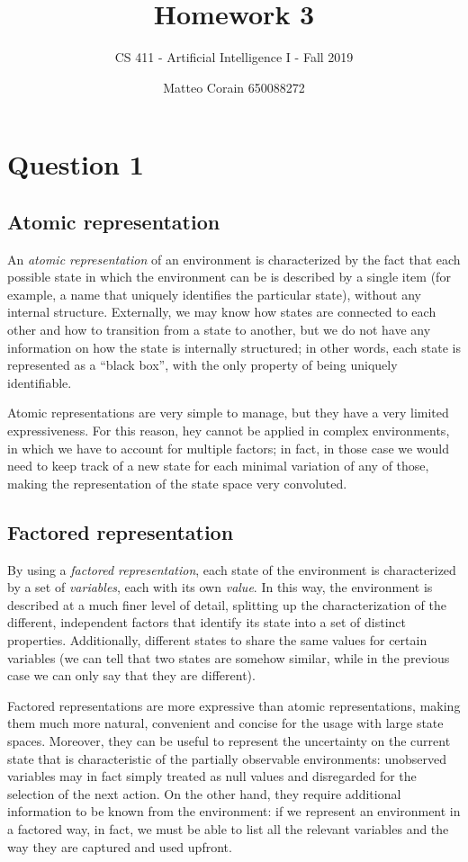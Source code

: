 \documentclass[letterpaper,headings=standardclasses]{scrartcl}
\title{Homework 3}
\subtitle{CS 411 - Artificial Intelligence I - Fall 2019}
\author{Matteo Corain 650088272}
\begin{document}
\maketitle

\section{Question 1}

\subsection{Atomic representation}

An \emph{atomic representation} of an environment is characterized by the fact that each possible state in which the environment can be is described by a single item (for example, a name that uniquely identifies the particular state), without any internal structure. Externally, we may know how states are connected to each other and how to transition from a  state to another, but we do not have any information on how the state is internally structured; in other words, each state is represented as a “black box”, with the only property of being uniquely identifiable.

Atomic representations are very simple to manage, but they have a very limited expressiveness. For this reason, hey cannot be applied in complex environments, in which we have to account for multiple factors; in fact, in those case we would need to keep track of a new state for each minimal variation of any of those, making the representation of the state space very convoluted.

\subsection{Factored representation}

By using a \emph{factored representation}, each state of the environment is characterized by a set of \emph{variables}, each with its own \emph{value}. In this way, the environment is described at a much finer level of detail, splitting up the characterization of the different, independent factors that identify its state into a set of distinct properties. Additionally, different states to share the same values for certain variables (we can tell that two states are somehow similar, while in the previous case we can only say that they are different).

Factored representations are more expressive than atomic representations, making them much more natural, convenient and concise for the usage with large state spaces. Moreover, they can be useful to represent the uncertainty on the current state that is characteristic of the partially observable environments: unobserved variables may in fact simply treated as null values and disregarded for the selection of the next action. On the other hand, they require additional information to be known from the environment: if we represent an environment in a factored way, in fact, we must be able to list all the relevant variables and the way they are captured and used upfront.
\end{document}
